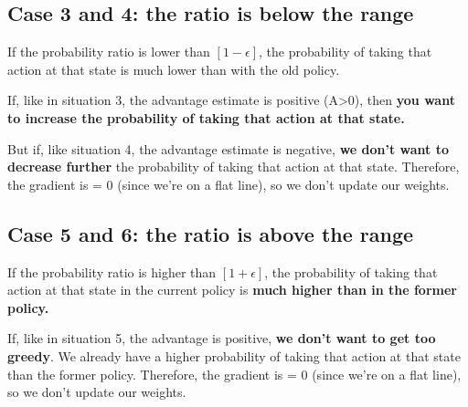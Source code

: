 \documentclass[11pt,a4paper]{article}
\begin{document}
\subsection{Case 3 and 4: the ratio is below the range}\label{case-3-and-4-the-ratio-is-below-the-range}


If the probability ratio is lower than \([1 - \epsilon]\), the probability of taking that action at that state is much lower than with the old policy.

If, like in situation 3, the advantage estimate is positive (A\textgreater0), then \textbf{you want to increase the probability of taking that action at that state.}

But if, like situation 4, the advantage estimate is negative, \textbf{we don't want to decrease further} the probability of taking that action at that state. Therefore, the gradient is = 0 (since we're on a flat line), so we don't update our weights.

\subsection{Case 5 and 6: the ratio is above the range}\label{case-5-and-6-the-ratio-is-above-the-range}


If the probability ratio is higher than \([1 + \epsilon]\), the probability of taking that action at that state in the current policy is \textbf{much higher than in the former policy.}

If, like in situation 5, the advantage is positive, \textbf{we don't want to get too greedy}. We already have a higher probability of taking that action at that state than the former policy. Therefore, the gradient is = 0 (since we're on a flat line), so we don't update our weights.
\end{document}
